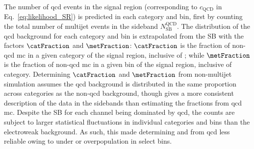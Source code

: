 The number of \acrshort{qcd} events in the signal region (corresponding to $c_{\mathrm{QCD}}$ in Eq.~\ref{eq:likelihood_SR}) is predicted in each category and \ptmiss bin, first by counting the total number of multijet events in the sideband $N_{\mathrm{SB}}^{\mathrm{QCD}}$. The distribution of the \acrshort{qcd} background for each category and \ptmiss bin is extrapolated from the \gls{SB} with the factors $\catFraction$ and $\metFraction$: $\catFraction$ is the fraction of non-\acrshort{qcd} \acrshort{mc} in a given category of the signal region, inclusive of \ptmiss; while $\metFraction$ is the fraction of non-\acrshort{qcd} \acrshort{mc} in a given \ptmiss bin of the signal region, inclusive of category. Determining $\catFraction$ and $\metFraction$ from non-multijet simulation assumes the \acrshort{qcd} background is distributed in the same proportion across categories as the non-\acrshort{qcd} background, though gives a more consistent description of the data in the sidebands than estimating the fractions from \acrshort{qcd} \acrshort{mc}. Despite the \gls{SB} for each channel being dominated by \acrshort{qcd}, the counts are subject to larger statistical fluctuations in individual categories and \ptmiss bins than the electroweak background. As such, this made determining \catFraction and \metFraction from \acrshort{qcd} less reliable owing to under or overpopulation in select bins.

